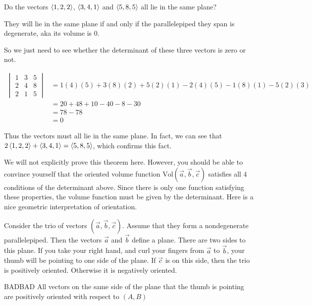 \documentclass{ximera}
\begin{document}
\begin{question}
  Do the vectors $\left\langle 1,2,2\right\rangle$, $\left\langle 3,4,1\right\rangle$ and $\left\langle 5,8,5\right\rangle$ all lie in the same plane?
  
  \begin{multipleChoice}
  \end{multipleChoice}
  
  \begin{hint}
    They will lie in the same plane if and only if the parallelepiped they span
    is degenerate, aka its volume is $0$.
  \end{hint}
  
  \begin{hint}
    So we just need to see whether the determinant of these three
    vectors is zero or not.
  \end{hint}
  
  \begin{hint}
    \begin{align*}
      \begin{vmatrix}
	1&3&5\\
	2&4&8\\
	2&1&5
      \end{vmatrix} &= 1(4)(5)+3(8)(2)+5(2)(1)-2(4)(5)-1(8)(1)-5(2)(3)\\
      &=20+48+10-40-8-30\\
      &=78-78\\
      &=0
    \end{align*}
    
    Thus the vectors must all lie in the same plane.  In fact, we can
    see that $2\left\langle 1,2,2\right\rangle+\left\langle 3,4,1\right\rangle=\left\langle 5,8,5\right\rangle$, which
    confirms this fact.
  \end{hint}
  
\end{question}
We will not explicitly prove this theorem here.  However, you
should be able to convince yourself that the oriented volume
function $\textrm{Vol}(\vec{a},\vec{b},\vec{c})$ satisfies all
$4$ conditions of the determinant above.  Since there is only
one function satisfying these properties, the volume function
must be given by the determinant.
Here is a nice geometric interpretation of orientation.

\begin{theorem}
  Consider the trio of vectors $(\vec{a},\vec{b},\vec{c})$.  Assume
  that they form a nondegenerate parallelepiped.  Then the vectors
  $\vec{a}$ and $\vec{b}$ define a plane.  There are two sides to this
  plane.  If you take your right hand, and curl your fingers from
  $\vec{a}$ to $\vec{b}$, your thumb will be pointing to one side of
  the plane.  If $\vec{c}$ is on this side, then the trio is
  positively oriented.  Otherwise it is negatively oriented.
  \begin{center}
    BADBAD
    All vectors on the same side of the plane that the thumb is pointing are positively oriented with respect to $(A,B)$
  \end{center}
\end{theorem}
\end{document}
